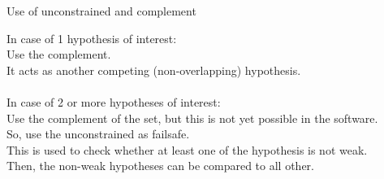 \documentclass[10pt]{beamer}\usepackage[]{graphicx}\usepackage[]{xcolor}
\begin{document}
%
\begin{frame}[fragile]{Use of unconstrained and complement}

In case of 1 hypothesis of interest:\\
Use the complement.\\
It acts as another competing (non-overlapping) hypothesis.\\
~\\
In case of 2 or more hypotheses of interest:\\
Use the complement of the set, but this is not yet possible in the software.\\
So, use the unconstrained as failsafe.\\
This is used to check whether at least one of the hypothesis is not weak.\\
Then, the non-weak hypotheses can be compared to all other.

\end{frame}
%
\end{document}
